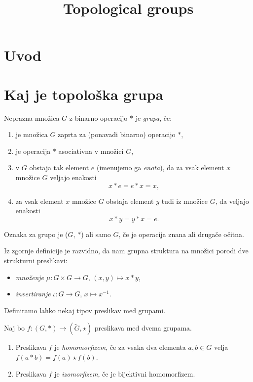 \documentclass[mat1]{fmfdelo}
\title{Topological groups}
\begin{document}
\section{Uvod}


\section{Kaj je topološka grupa}

\begin{definicija}\label{def:grupa}
Neprazna množica $G$ z binarno operacijo $*$ je \emph{grupa}, če:
\begin{enumerate}
\item je množica $G$ zaprta za (ponavadi binarno) operacijo $*$,
\item je operacija $*$ asociativna v množici $G$,
\item v $G$ obstaja tak element $e$ (imenujemo ga \emph{enota}), da za vsak element $x$ množice $G$ veljajo enakosti \[ x*e = e*x = x, \]
\item za vsak element $x$ množice $G$ obstaja element $y$ tudi iz množice $G$, da veljajo enakosti \[ x*y = y*x = e. \]
\end{enumerate}
Oznaka za grupo je ($G$, $*$) ali samo $G$, če je operacija znana ali drugače očitna.
\end{definicija}

Iz zgornje definicije je razvidno, da nam grupna struktura na množici porodi dve strukturni preslikavi:
\begin{itemize}
\item \emph{množenje} $\mu: G \times G \to G$, $(x, y) \mapsto x*y$,
\item \emph{invertiranje} $\iota: G \to G$, $x \mapsto x^{-1}$.
\end{itemize}

Definiramo lahko nekaj tipov preslikav med grupami.

\begin{definicija}\label{def:algpreslikave}
Naj bo $f: (G, *) \to (\widetilde{G}, \star)$ preslikava med dvema grupama.
\begin{enumerate}
\item Preslikava $f$ je \emph{homomorfizem}, če za vsaka dva elementa $a, b \in G$ velja $f(a*b) = f(a) \star f(b)$.
\item Preslikava $f$ je \emph{izomorfizem}, če je bijektivni homomorfizem.
\end{enumerate}
\end{definicija}
\end{document}
